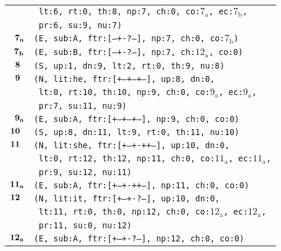 \documentclass{article}
\begin{document}
\begin{minipage}{\textwidth}
{\begin{tabular}{|r|l|}
    & \texttt{\texttt{~lt:6,~rt:0,~th:8,~np:7,~ch:0,~co:${\textrm{7}_{\textrm{a}}}$,~ec:${\textrm{7}_{\textrm{b}}}$,}} \\
    & \texttt{\texttt{~pr:6,~su:9,~nu:7)}} \\
    ${\textbf{\textrm{7}}_{\textbf{\textrm{a}}}}$ & \texttt{\texttt{(E,~sub:A,~ftr:[---+-?---],~np:7,~ch:0,~co:${\textrm{7}_{\textrm{b}}}$)}} \\
    ${\textbf{\textrm{7}}_{\textbf{\textrm{b}}}}$ & \texttt{\texttt{(E,~sub:B,~ftr:[---+-?---],~np:7,~ch:${\textrm{12}_{\textrm{a}}}$,~co:0)}} \\
    ${\textbf{\textrm{8}}_{\phantom{z}}}$ & \texttt{\texttt{(S,~up:1,~dn:9,~lt:2,~rt:0,~th:9,~nu:8)}} \\
    ${\textbf{\textrm{9}}_{\phantom{z}}}$ & \texttt{\texttt{(N,~lit:he,~ftr:[+--+--+--],~up:8,~dn:0,}} \\
    & \texttt{\texttt{~lt:0,~rt:10,~th:10,~np:9,~ch:0,~co:${\textrm{9}_{\textrm{a}}}$,~ec:${\textrm{9}_{\textrm{a}}}$,}} \\
    & \texttt{\texttt{~pr:7,~su:11,~nu:9)}} \\
    ${\textbf{\textrm{9}}_{\textbf{\textrm{a}}}}$ & \texttt{\texttt{(E,~sub:A,~ftr:[+--+--+--],~np:9,~ch:0,~co:0)}} \\
    ${\textbf{\textrm{10}}_{\phantom{z}}}$ & \texttt{\texttt{(S,~up:8,~dn:11,~lt:9,~rt:0,~th:11,~nu:10)}} \\
    ${\textbf{\textrm{11}}_{\phantom{z}}}$ & \texttt{\texttt{(N,~lit:she,~ftr:[+--+-++--],~up:10,~dn:0,}} \\
    & \texttt{\texttt{~lt:0,~rt:12,~th:12,~np:11,~ch:0,~co:${\textrm{11}_{\textrm{a}}}$,~ec:${\textrm{11}_{\textrm{a}}}$,}} \\
    & \texttt{\texttt{~pr:9,~su:12,~nu:11)}} \\
    ${\textbf{\textrm{11}}_{\textbf{\textrm{a}}}}$ & \texttt{\texttt{(E,~sub:A,~ftr:[+--+-++--],~np:11,~ch:0,~co:0)}} \\
    ${\textbf{\textrm{12}}_{\phantom{z}}}$ & \texttt{\texttt{(N,~lit:it,~ftr:[+--+-?---],~up:10,~dn:0,}} \\
    & \texttt{\texttt{~lt:11,~rt:0,~th:0,~np:12,~ch:0,~co:${\textrm{12}_{\textrm{a}}}$,~ec:${\textrm{12}_{\textrm{a}}}$,}} \\
    & \texttt{\texttt{~pr:11,~su:0,~nu:12)}} \\
    ${\textbf{\textrm{12}}_{\textbf{\textrm{a}}}}$ & \texttt{\texttt{(E,~sub:A,~ftr:[+--+-?---],~np:12,~ch:0,~co:0)}} \\
    \hline
  \end{tabular}
  }
\end{minipage}
\bigbreak
\end{document}
